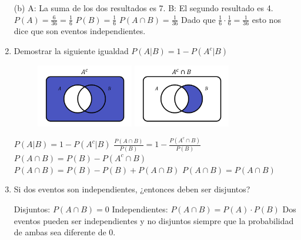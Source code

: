 \documentclass[a4paper, 12pt]{article}
\newcommand{\Pspace}{0.5cm}
\newcommand{\Aspace}{0.2cm}
\begin{document}
\begin{enumerate}
    \vspace{\Aspace}
    (b) A: La suma de los dos resultados es 7. B: El segundo resultado es 4.
    \\ { \color{azul} 
        $P(A) = \frac{6}{36} = \frac{1}{6}$
        \newline $P(B) = \frac{1}{6}$
        \newline $P(A \cap B) = \frac{1}{36}$
        \newline Dado que $\frac{1}{6} \cdot \frac{1}{6} = \frac{1}{36}$ esto nos dice que son eventos independientes.
    }
    
    
    \newpage
    \vspace{\Pspace}
    \item Demostrar la siguiente igualdad $P(A | B) = 1 - P(A^{c} | B)$
    \begin{figure}[h]
        \centering
        \includegraphics[width=0.4\textwidth]{./Images/Complemento.png}
        \includegraphics[width=0.4\textwidth]{./Images/Interseccion.png}
    \end{figure}
    \vspace{\Aspace} \par
    { \color{azul} 
        $P(A | B) = 1 - P(A^{c} | B)$
        \newline $\frac{P(A \cap B)}{P(B)} = 1 - \frac{P(A^{c} \cap B)}{P(B)}$
        \newline $P(A \cap B) = P(B) - P(A^{c} \cap B)$
        \newline $P(A \cap B) = P(B) - P(B) + P(A \cap B)$
        \newline $P(A \cap B) = P(A \cap B)$
    }

    
    \vspace{\Pspace}
    \item Si dos eventos son independientes, ¿entonces deben ser disjuntos?
    \vspace{\Aspace} \par
    { \color{azul} 
        Disjuntos: $P(A \cap B) = 0$
        \newline Independientes: $P(A \cap B) = P(A) \cdot P(B)$
        \newline Dos eventos pueden ser independientes y no disjuntos siempre que la probabilidad de ambas sea diferente de 0.
    }



\end{enumerate}
\end{document}
